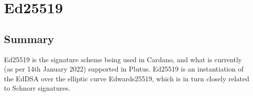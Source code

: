 \section{Ed25519}
\label{sec:ed25519}
\newcommand{\keygen}{\texttt{KeyGen}}
\newcommand{\sign}{\texttt{Sign}}
\newcommand{\verify}{\texttt{Verify}}
\newcommand{\secparam}{\lambda}
\newcommand{\secretkey}{x}
\newcommand{\signingkey}{sk}
\newcommand{\vk}{vk}
\newcommand{\signature}{\sigma}


\newcommand{\ec}{E}
\newcommand{\cofvar}{\texttt{cofvar}}
\newcommand{\group}{\mathbf{G}}
\newcommand{\generator}{G}
\newcommand{\order}{q}
\newcommand{\hash}{\texttt{H}}

\subsection{Summary}
Ed25519 is the signature scheme being used in Cardano, and what is currently (as per 14th January 2022) supported in Plutus. Ed25519 is an instantiation of the EdDSA over the elliptic curve Edwards25519, which is in turn closely related to Schnorr signatures.
